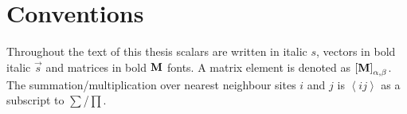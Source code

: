 \section*{Conventions}
Throughout the text of this thesis scalars are written in italic \(s\), vectors in bold italic \(\vec{s}\) and matrices in bold \(\textbf{M}\) fonts.
A matrix element is denoted as \(\left[\textbf{M}\right]_{\alpha, \beta}\).
The summation/multiplication over nearest neighbour sites \(i\) and \(j\) is \(\left\langle ij \right\rangle\) as a subscript to \(\sum\)/\(\prod\).


